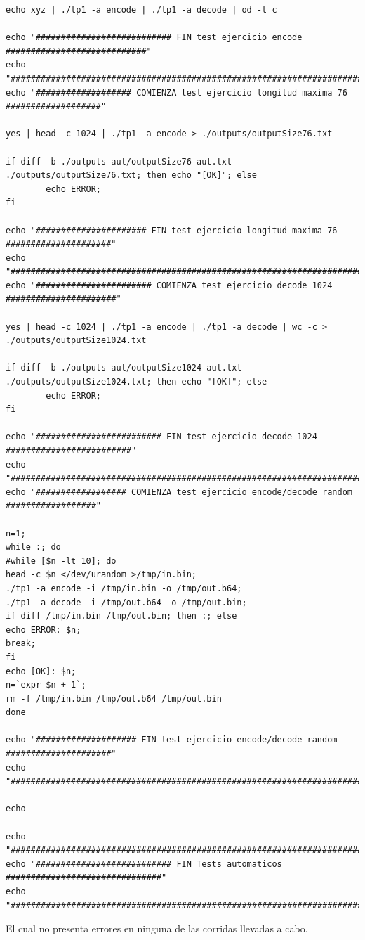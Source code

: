\documentclass[11pt,a4paper]{article}
\begin{document}
\begin{lstlisting}
echo xyz | ./tp1 -a encode | ./tp1 -a decode | od -t c

echo "########################### FIN test ejercicio encode ############################"
echo "##################################################################################"
echo "################### COMIENZA test ejercicio longitud maxima 76 ###################"

yes | head -c 1024 | ./tp1 -a encode > ./outputs/outputSize76.txt

if diff -b ./outputs-aut/outputSize76-aut.txt ./outputs/outputSize76.txt; then echo "[OK]"; else
		echo ERROR;
fi

echo "###################### FIN test ejercicio longitud maxima 76 #####################"
echo "##################################################################################"
echo "####################### COMIENZA test ejercicio decode 1024 ######################"

yes | head -c 1024 | ./tp1 -a encode | ./tp1 -a decode | wc -c > ./outputs/outputSize1024.txt

if diff -b ./outputs-aut/outputSize1024-aut.txt ./outputs/outputSize1024.txt; then echo "[OK]"; else
		echo ERROR;
fi

echo "######################### FIN test ejercicio decode 1024 #########################"
echo "##################################################################################"
echo "################## COMIENZA test ejercicio encode/decode random ##################"

n=1;
while :; do
#while [$n -lt 10]; do
head -c $n </dev/urandom >/tmp/in.bin;
./tp1 -a encode -i /tmp/in.bin -o /tmp/out.b64;
./tp1 -a decode -i /tmp/out.b64 -o /tmp/out.bin;
if diff /tmp/in.bin /tmp/out.bin; then :; else
echo ERROR: $n;
break;
fi
echo [OK]: $n;
n=`expr $n + 1`;
rm -f /tmp/in.bin /tmp/out.b64 /tmp/out.bin
done

echo "#################### FIN test ejercicio encode/decode random #####################"
echo "##################################################################################"

echo

echo "##################################################################################"
echo "########################### FIN Tests automaticos  ###############################"
echo "##################################################################################"
\end{lstlisting}

El cual no presenta errores en ninguna de las corridas llevadas a cabo.
\end{document}
